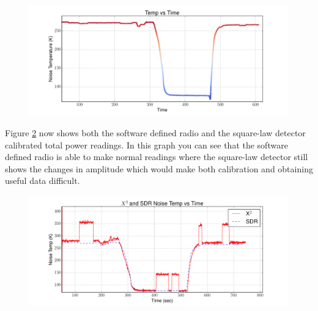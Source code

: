\begin{figure}[h!tb] \centering

\includegraphics[width=\textwidth]{Experiments/Exp4/calib_filtered.pdf}

\label{sdr_calib_filter}
\end{figure}

Figure \ref{filter_on} now shows both the software defined radio and the square-law detector calibrated total power readings.  In this graph you can see that the software defined radio is able to make normal readings where the square-law detector still shows the changes in amplitude which would make both calibration and obtaining useful data difficult.

\begin{figure}[h!tb] \centering

\includegraphics[width=\textwidth]{Experiments/Exp4/calib_filtered_both.pdf}

\label{filter_on}
\end{figure}


